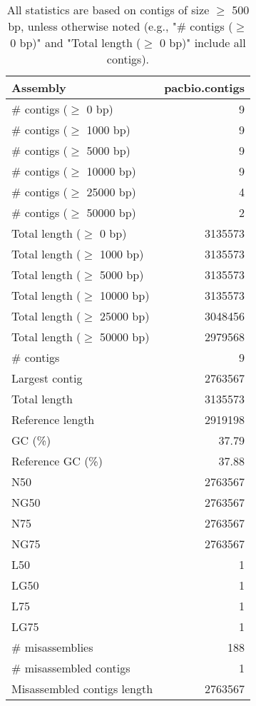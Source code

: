 \documentclass[12pt,a4paper]{article}
\begin{document}
\begin{table}[ht]
\begin{center}
\caption{All statistics are based on contigs of size $\geq$ 500 bp, unless otherwise noted (e.g., "\# contigs ($\geq$ 0 bp)" and "Total length ($\geq$ 0 bp)" include all contigs).}
\begin{tabular}{|l*{1}{|r}|}
\hline
Assembly & pacbio.contigs \\ \hline
\# contigs ($\geq$ 0 bp) & 9 \\ \hline
\# contigs ($\geq$ 1000 bp) & 9 \\ \hline
\# contigs ($\geq$ 5000 bp) & 9 \\ \hline
\# contigs ($\geq$ 10000 bp) & 9 \\ \hline
\# contigs ($\geq$ 25000 bp) & 4 \\ \hline
\# contigs ($\geq$ 50000 bp) & 2 \\ \hline
Total length ($\geq$ 0 bp) & 3135573 \\ \hline
Total length ($\geq$ 1000 bp) & 3135573 \\ \hline
Total length ($\geq$ 5000 bp) & 3135573 \\ \hline
Total length ($\geq$ 10000 bp) & 3135573 \\ \hline
Total length ($\geq$ 25000 bp) & 3048456 \\ \hline
Total length ($\geq$ 50000 bp) & 2979568 \\ \hline
\# contigs & 9 \\ \hline
Largest contig & 2763567 \\ \hline
Total length & 3135573 \\ \hline
Reference length & 2919198 \\ \hline
GC (\%) & 37.79 \\ \hline
Reference GC (\%) & 37.88 \\ \hline
N50 & 2763567 \\ \hline
NG50 & 2763567 \\ \hline
N75 & 2763567 \\ \hline
NG75 & 2763567 \\ \hline
L50 & 1 \\ \hline
LG50 & 1 \\ \hline
L75 & 1 \\ \hline
LG75 & 1 \\ \hline
\# misassemblies & 188 \\ \hline
\# misassembled contigs & 1 \\ \hline
Misassembled contigs length & 2763567 \\ \hline

\end{tabular}
\end{center}
\end{table}
\end{document}
